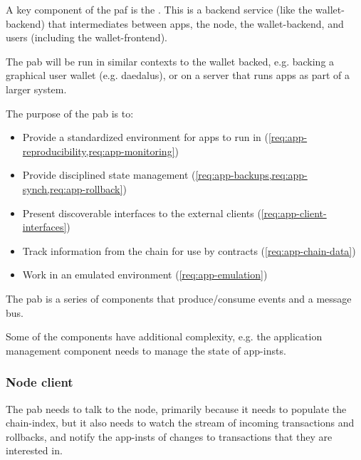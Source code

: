 \medskip

A key component of the \gls{paf} is the .
This is a backend service (like the \gls{wallet-backend}) that intermediates between \glspl{app}, the \gls{node}, the \gls{wallet-backend}, and users (including the \gls{wallet-frontend}).

The \gls{pab} will be run in similar contexts to the wallet backed, e.g. backing a graphical user wallet (e.g. \gls{daedalus}), or on a server that runs \glspl{app} as part of a larger system.

The purpose of the \gls{pab} is to:
\begin{itemize}
\item Provide a standardized environment for \glspl{app} to run in (\cref{req:app-reproducibility,req:app-monitoring})
\item Provide disciplined state management (\cref{req:app-backups,req:app-synch,req:app-rollback})
\item Present discoverable interfaces to the external clients (\cref{req:app-client-interfaces})
\item Track information from the chain for use by contracts (\cref{req:app-chain-data})
\item Work in an emulated environment (\cref{req:app-emulation})
\end{itemize}

The \gls{pab} is a series of components that produce/consume events and a message bus.

Some of the components have additional complexity, e.g. the application management component needs to manage the state of \glspl{app-inst}.

\subsubsection{Node client}
The \gls{pab} needs to talk to the \gls{node}, primarily because it needs to populate the \gls{chain-index}, but it also needs to watch the stream of incoming transactions and rollbacks, and notify the \glspl{app-inst} of changes to transactions that they are interested in.

